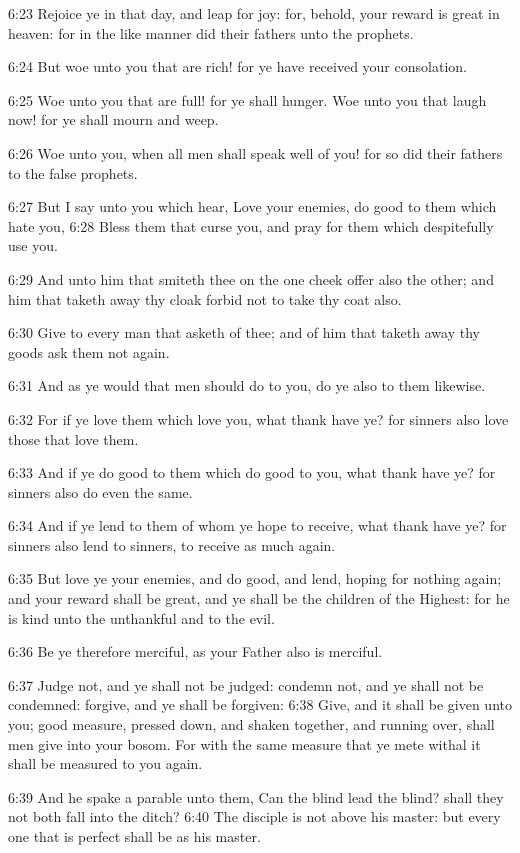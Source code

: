 6:23 Rejoice ye in that day, and leap for joy: for, behold, your
reward is great in heaven: for in the like manner did their fathers
unto the prophets.

6:24 But woe unto you that are rich! for ye have received your
consolation.

6:25 Woe unto you that are full! for ye shall hunger. Woe unto you
that laugh now! for ye shall mourn and weep.

6:26 Woe unto you, when all men shall speak well of you! for so did
their fathers to the false prophets.

6:27 But I say unto you which hear, Love your enemies, do good to them
which hate you, 6:28 Bless them that curse you, and pray for them
which despitefully use you.

6:29 And unto him that smiteth thee on the one cheek offer also the
other; and him that taketh away thy cloak forbid not to take thy coat
also.

6:30 Give to every man that asketh of thee; and of him that taketh
away thy goods ask them not again.

6:31 And as ye would that men should do to you, do ye also to them
likewise.

6:32 For if ye love them which love you, what thank have ye? for
sinners also love those that love them.

6:33 And if ye do good to them which do good to you, what thank have
ye?  for sinners also do even the same.

6:34 And if ye lend to them of whom ye hope to receive, what thank
have ye? for sinners also lend to sinners, to receive as much again.

6:35 But love ye your enemies, and do good, and lend, hoping for
nothing again; and your reward shall be great, and ye shall be the
children of the Highest: for he is kind unto the unthankful and to the
evil.

6:36 Be ye therefore merciful, as your Father also is merciful.

6:37 Judge not, and ye shall not be judged: condemn not, and ye shall
not be condemned: forgive, and ye shall be forgiven: 6:38 Give, and it
shall be given unto you; good measure, pressed down, and shaken
together, and running over, shall men give into your bosom. For with
the same measure that ye mete withal it shall be measured to you
again.

6:39 And he spake a parable unto them, Can the blind lead the blind?
shall they not both fall into the ditch?  6:40 The disciple is not
above his master: but every one that is perfect shall be as his
master.

